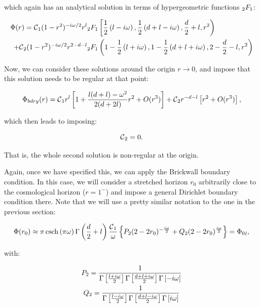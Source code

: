 \documentclass[11pt,a4paper]{article}
\begin{document}
{{\noindent which again has an analytical solution in terms of hypergeometric functions ${}_2F_1$:}

\begin{equation}\LA{SOL_STATIC}
    \begin{aligned}
        \Phi(r) = \calc_1(1-r^2)^{-i\w/2}r^l&\hypr\left[\half\left(l-i\w\right),\half\left(d+l-i\w\right),\frac{d}{2}+l,r^2\right) \\
        + \calc_2(1-r^2)^{-i\w/2}r^{2-d-l}&\hypr\left(1-\half\left(l+i\w\right),1-\half\left(d+l+i\w\right),2-\frac{d}{2}-l,r^2\right)
    \end{aligned}
\end{equation}

Now, we can consider these solutions around the origin $r\rightarrow0$, and impose that this solution needs to be regular at that point:

\begin{equation}
    \Phi_{bdry}(r) = \mbox{${\cal C}$}_1 r^l\left[1+\frac{l(d+l)-\omega^2}{2(d+2l)}r^2 + O(r^3)\right] + \mbox{${\cal C}$}_2r^{-d-l}\left[r^2+O(r^3)\right],
\end{equation}

{\noindent which then leads to imposing:}

\begin{equation}
    \mbox{${\cal C}$}_2 = 0.
\end{equation}

{\noindent That is, the whole second solution is non-regular at the origin.}

Again, once we have specified this, we can apply the Brickwall boundary condition. In this case, we will consider a stretched horizon $r_0$ arbitrarily close to the cosmological horizon ($r=1^-$) and impose a general Dirichlet boundary condition there. Note that we will use a pretty similar notation to the one in the previous section:

\begin{equation}
    \Phi(r_0)\approx\pi \operatorname{csch}\left(\pi\omega\right)\Gamma\left(\frac{d}{2}+l\right) \frac{\mbox{${\cal C}$}_1}{\omega}\left\{P_2(2-2r_0)^{-\frac{i\omega}{2}}+Q_2(2-2r_0)^{\frac{i\omega}{2}}\right\}= {\Phi_0}_l,
\end{equation}

{\noindent with:}

\begin{equation}\LA{STATIC_BOUNDARY}
    \begin{gathered}
        P_2 =\frac{1}{\Gamma\left[\frac{l+i\w}{2}\right]\Gamma\left[\frac{d+l+i\w}{2}\right]\Gamma\left[-i\omega\right]}\\
        Q_2=\frac{1}{\Gamma\left[\frac{l-i\w}{2}\right]\Gamma\left[\frac{d+l-i\w}{2}\right]\Gamma\left[i\omega\right]} 
    \end{gathered}
\end{equation}

}
\end{document}
